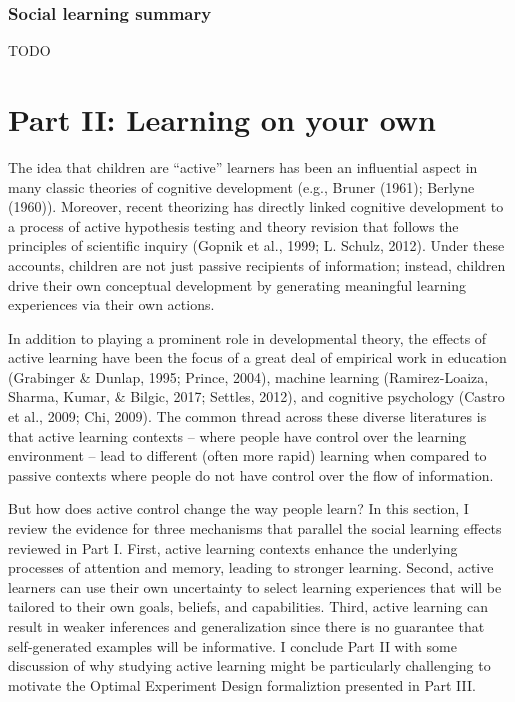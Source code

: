 \documentclass[english,floatsintext,man]{apa6}
\theoremstyle{definition}
\theoremstyle{definition}
\theoremstyle{definition}
\theoremstyle{remark}
\begin{document}
\subsubsection{Social learning summary}\label{social-learning-summary}

TODO

\section{Part II: Learning on your
own}\label{part-ii-learning-on-your-own}

The idea that children are \enquote{active} learners has been an
influential aspect in many classic theories of cognitive development
(e.g., Bruner (1961); Berlyne (1960)). Moreover, recent theorizing has
directly linked cognitive development to a process of active hypothesis
testing and theory revision that follows the principles of scientific
inquiry (Gopnik et al., 1999; L. Schulz, 2012). Under these accounts,
children are not just passive recipients of information; instead,
children drive their own conceptual development by generating meaningful
learning experiences via their own actions.

In addition to playing a prominent role in developmental theory, the
effects of active learning have been the focus of a great deal of
empirical work in education (Grabinger \& Dunlap, 1995; Prince, 2004),
machine learning (Ramirez-Loaiza, Sharma, Kumar, \& Bilgic, 2017;
Settles, 2012), and cognitive psychology (Castro et al., 2009; Chi,
2009). The common thread across these diverse literatures is that active
learning contexts -- where people have control over the learning
environment -- lead to different (often more rapid) learning when
compared to passive contexts where people do not have control over the
flow of information.

But how does active control change the way people learn? In this
section, I review the evidence for three mechanisms that parallel the
social learning effects reviewed in Part I. First, active learning
contexts enhance the underlying processes of attention and memory,
leading to stronger learning. Second, active learners can use their own
uncertainty to select learning experiences that will be tailored to
their own goals, beliefs, and capabilities. Third, active learning can
result in weaker inferences and generalization since there is no
guarantee that self-generated examples will be informative. I conclude
Part II with some discussion of why studying active learning might be
particularly challenging to motivate the Optimal Experiment Design
formaliztion presented in Part III.
\end{document}
